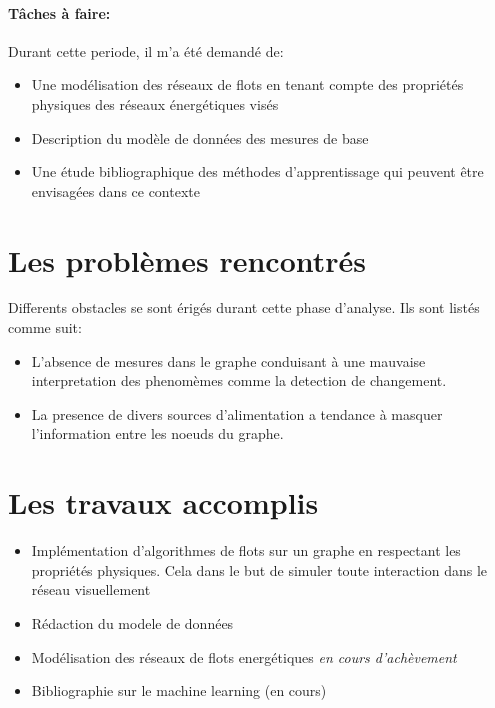 \documentclass [a4paper,10pt]{article}
\begin{document}
		\paragraph{T\^aches \`a faire: }
		Durant cette periode, il m'a \'et\'e demand\'e de:
			\begin{itemize}
				\item Une mod\'elisation des r\'eseaux de flots en tenant compte des propri\'et\'es physiques des r\'eseaux \'energ\'etiques vis\'es
				\item Description du mod\`ele de donn\'ees des mesures de base
				\item Une \'etude bibliographique des m\'ethodes d'apprentissage qui peuvent \^etre envisag\'ees dans ce contexte
				
			\end{itemize}

	\section{Les probl\`emes rencontr\'es}
	Differents obstacles se sont \'erig\'es durant cette phase d'analyse. Ils sont list\'es comme suit:
	\begin{itemize}
		\item L'absence de mesures dans le graphe conduisant \`a une mauvaise interpretation des phenom\`emes comme la detection de changement.
		\item La presence de divers sources d'alimentation a tendance \`a masquer l'information entre les noeuds du graphe.
	\end{itemize}

	\section{Les travaux accomplis}
	\begin{itemize}
		\item Impl\'ementation d'algorithmes de flots sur un graphe en respectant les propri\'et\'es physiques. Cela dans le but de simuler toute interaction dans le r\'eseau visuellement
		\item R\'edaction du modele de donn\'ees
		\item  Mod\'elisation des r\'eseaux de flots energ\'etiques \textit{en cours d'ach\`evement}
		\item Bibliographie sur le machine learning (en cours)
	\end{itemize}
	
\end{document}
